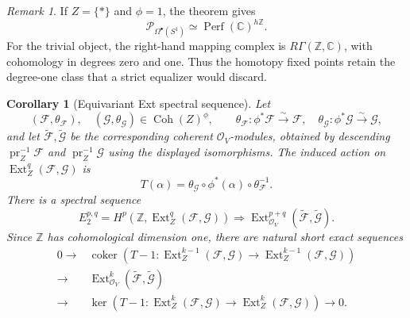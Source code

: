 \documentclass[12pt]{amsart}
\newtheorem{cor}[thm]{Corollary}
\theoremstyle{definition}
\theoremstyle{remark}
\newtheorem{rem}[thm]{Remark}
\numberwithin{equation}{section}
\newcommand{\CO}{\mathcal O}
\newcommand{\C}{\mathbb C}
\newcommand{\ext}{\operatorname{Ext}}
\begin{document}
\begin{rem}
If \(Z=\{*\}\) and \(\phi=1\), the theorem gives
\[
\mathcal P_{\Omega^\bullet(S^1)}
\simeq
\operatorname{Perf}(\C)^{h\mathbb Z}.
\]
For the trivial object, the right-hand mapping complex is
\(R\Gamma(\mathbb Z,\C)\), with cohomology in degrees zero and one.  Thus
the homotopy fixed points retain the degree-one class that a strict
equalizer would discard.
\end{rem}

\begin{cor}[Equivariant Ext spectral sequence]
\label{cor:suspension-equivariant-ext}
Let
\[
(\mathcal F,\theta_{\mathcal F}),
\quad
(\mathcal G,\theta_{\mathcal G})
\in\operatorname{Coh}(Z)^\phi,
\qquad
\theta_{\mathcal F}:\phi^*\mathcal F\xrightarrow{\sim}\mathcal F,
\quad
\theta_{\mathcal G}:\phi^*\mathcal G\xrightarrow{\sim}\mathcal G,
\]
and let \(\widetilde{\mathcal F},\widetilde{\mathcal G}\) be the
corresponding coherent \(\CO_V\)-modules, obtained by descending
\(\operatorname{pr}_Z^{-1}\mathcal F\) and
\(\operatorname{pr}_Z^{-1}\mathcal G\) using the displayed isomorphisms.
The induced action on
\(\ext_Z^q(\mathcal F,\mathcal G)\) is
\[
T(\alpha)
=
\theta_{\mathcal G}\circ\phi^*(\alpha)\circ
\theta_{\mathcal F}^{-1}.
\]
There is a spectral sequence
\[
E_2^{p,q}
=
H^p\left(
\mathbb Z,\ext_Z^q(\mathcal F,\mathcal G)
\right)
\Longrightarrow
\ext_{\CO_V}^{p+q}
\left(
\widetilde{\mathcal F},\widetilde{\mathcal G}
\right).
\]
Since \(\mathbb Z\) has cohomological dimension one, there are natural
short exact sequences
\[
\begin{split}
0\longrightarrow&
\operatorname{coker}\left(
T-1:\ext_Z^{k-1}(\mathcal F,\mathcal G)
\longrightarrow
\ext_Z^{k-1}(\mathcal F,\mathcal G)
\right)\\
\longrightarrow&
\ext_{\CO_V}^{k}
\left(
\widetilde{\mathcal F},\widetilde{\mathcal G}
\right)\\
\longrightarrow&
\ker\left(
T-1:\ext_Z^{k}(\mathcal F,\mathcal G)
\longrightarrow
\ext_Z^{k}(\mathcal F,\mathcal G)
\right)
\longrightarrow0.
\end{split}
\]
\end{cor}
\end{document}
